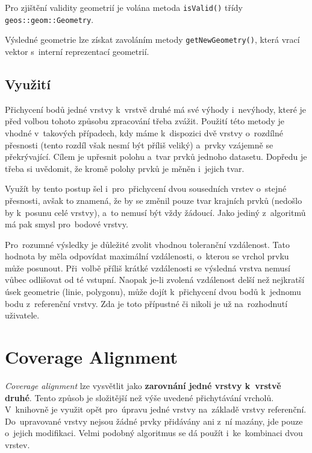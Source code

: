 Pro zjištění validity geometrií je volána metoda \texttt{isValid()} 
třídy \texttt{geos::geom::\-Geometry}.

Výsledné geometrie lze získat zavoláním metody \texttt{getNewGeometry()},
která vrací vektor s~interní reprezentací geometrií.


\subsection{Využití}
\label{vs-vyuziti}

Přichycení bodů jedné vrstvy k~vrstvě druhé má své výhody i~nevýhody, které 
je před volbou tohoto způsobu zpracování třeba zvážit. Použití této metody 
je vhodné v~takových případech, kdy máme k~dispozici dvě vrstvy o~rozdílné 
přesnosti (tento rozdíl však nesmí být příliš veliký) a~prvky vzájemně se 
překrývající. Cílem je upřesnit polohu a~tvar prvků jednoho datasetu. 
Dopředu je třeba si uvědomit, že kromě polohy prvků je měněn i~jejich tvar.

Využít by tento postup šel i~pro~přichycení dvou sousedních vrstev o~stejné 
přesnosti, avšak to znamená, že by se změnil pouze tvar krajních prvků 
(nedošlo by k~posunu celé vrstvy), a~to nemusí být vždy žádoucí. Jako jediný
z~algoritmů  má pak smysl pro~bodové vrstvy.

Pro~rozumné výsledky je důležité zvolit vhodnou toleranční vzdálenost. Tato 
hodnota by měla odpovídat maximální vzdálenosti, o~kterou se vrchol prvku 
může posunout. Při~volbě příliš krátké vzdálenosti se výsledná vrstva nemusí 
vůbec odlišovat od té vstupní. Naopak \mbox{je-li} zvolená vzdálenost delší 
než nejkratší úsek geometrie (linie, polygonu), může dojít k~přichycení dvou 
bodů k~jednomu bodu z~referenční vrstvy. Zda je toto přípustné či nikoli je 
už na~rozhodnutí uživatele.


\section{Coverage Alignment} 
\label{coverage alignment}

\textit{Coverage alignment} lze vysvětlit jako \textbf{zarovnání jedné vrstvy 
k~vrstvě druhé}. Tento způsob je složitější než výše uvedené přichytávání vrcholů.
V~knihovně  je využit opět pro~úpravu jedné vrstvy na~základě vrstvy 
referenční. Do~upravované vrstvy nejsou žádné prvky přidávány ani z~ní mazány,
jde pouze o~jejich modifikaci. Velmi podobný algoritmus se dá použít 
i~ke~kombinaci dvou vrstev.

